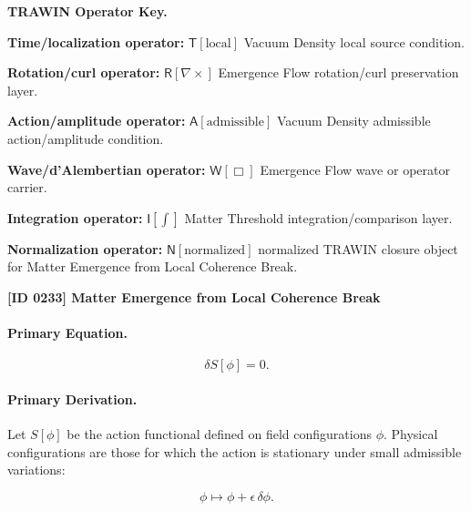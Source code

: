 \par\vspace{0.45\baselineskip}
\noindent\begin{minipage}[t]{\linewidth}
\begingroup
\small
\raggedright
\textbf{TRAWIN Operator Key.}\par
\noindent\textbf{Time/localization operator:} $\mathsf{T}\!\left[\mathrm{local}\right]$ Vacuum Density local source condition.\par
\noindent\textbf{Rotation/curl operator:} $\mathsf{R}\!\left[\nabla\times\right]$ Emergence Flow rotation/curl preservation layer.\par
\noindent\textbf{Action/amplitude operator:} $\mathsf{A}\!\left[\mathrm{admissible}\right]$ Vacuum Density admissible action/amplitude condition.\par
\noindent\textbf{Wave/d'Alembertian operator:} $\mathsf{W}\!\left[\Box\right]$ Emergence Flow wave or operator carrier.\par
\noindent\textbf{Integration operator:} $\mathsf{I}\!\left[\int\right]$ Matter Threshold integration/comparison layer.\par
\noindent\textbf{Normalization operator:} $\mathsf{N}\!\left[\mathrm{normalized}\right]$ normalized TRAWIN closure object for Matter Emergence from Local Coherence Break.\par
\endgroup
\end{minipage}

\clearpage
\noindent\textbf{[ID 0233] Matter Emergence from Local Coherence Break}\par
\vspace{0.35em}
\paragraph{Primary Equation.}
\begin{equation}
\delta S[\phi]=0 .
\end{equation}

\paragraph{Primary Derivation.}
Let $S[\phi]$ be the action functional defined on field configurations $\phi$.  
Physical configurations are those for which the action is stationary under small admissible variations:

\begin{equation}
\phi \mapsto \phi+\epsilon\,\delta\phi .
\end{equation}

